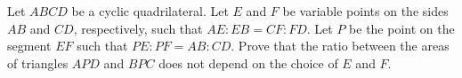 Let $ABCD$ be a cyclic quadrilateral. Let $E$ and $F$ be variable points on the sides $AB$ and $CD$, respectively, such that $AE:EB = CF:FD$. Let $P$ be the point on the segment $EF$ such that $PE:PF = AB:CD$. Prove that the ratio between the areas of triangles $APD$ and $BPC$ does not depend on the choice of $E$ and $F$.
